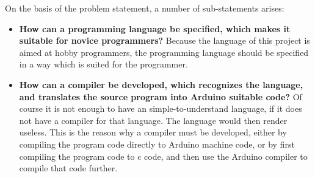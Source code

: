 On the basis of the problem statement, a number of sub-statements arises:
\begin{itemize}
	\item \textbf{How can a programming language be specified, which makes it suitable for novice programmers?} Because the language of this project is aimed at hobby programmers, the programming language should be specified in a way which is suited for the programmer.
	\item \textbf{How can a compiler be developed, which recognizes the language, and translates the source program into Arduino suitable code?} Of course it is not enough to have an simple-to-understand language, if it does not have a compiler for that language. The language would then render useless. This is the reason why a compiler must be developed, either by compiling the program code directly to Arduino machine code, or by first compiling the program code to c code, and then use the Arduino compiler to compile that code further. 
\end{itemize}